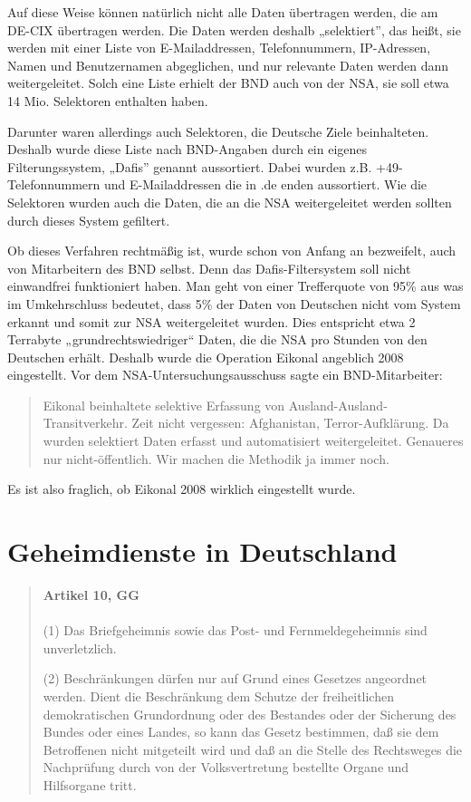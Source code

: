 \documentclass[12pt,a4paper]{scrartcl}
\begin{document}
Auf diese Weise können natürlich nicht alle Daten übertragen werden, die am DE-CIX übertragen werden. Die Daten werden deshalb „selektiert”, das heißt, sie werden mit einer Liste von E-Mailaddressen, Telefonnummern, IP-Adressen, Namen und Benutzernamen abgeglichen, und nur relevante Daten werden dann weitergeleitet. Solch eine Liste erhielt der BND auch von der NSA, sie soll etwa 14 Mio. Selektoren enthalten haben.\cite{ard_selektoren}

Darunter waren allerdings auch Selektoren, die Deutsche Ziele beinhalteten. Deshalb wurde diese Liste nach BND-Angaben durch ein eigenes Filterungssystem, „Dafis” genannt aussortiert. Dabei wurden z.B. +49-Telefonnummern und E-Mailaddressen die in .de enden aussortiert. Wie die Selektoren wurden auch die Daten, die an die NSA weitergeleitet werden sollten durch dieses System gefiltert.\cite{bundestag_selektoren}

Ob dieses Verfahren rechtmäßig ist, wurde schon von Anfang an bezweifelt, auch von Mitarbeitern des BND selbst. Denn das Dafis-Filtersystem soll nicht einwandfrei funktioniert haben. Man geht von einer Trefferquote von 95\% aus was im Umkehrschluss bedeutet, dass 5\% der Daten von Deutschen nicht vom System erkannt und somit zur NSA weitergeleitet wurden. Dies entspricht etwa 2 Terrabyte „grundrechtswiedriger“ Daten, die die NSA pro Stunden von den Deutschen erhält.\cite{wiki_eikonal} Deshalb wurde die Operation Eikonal angeblich 2008 eingestellt. Vor dem NSA-Untersuchungsausschuss sagte ein BND-Mitarbeiter:

\begin{quote}
Eikonal beinhaltete selektive Erfassung von Ausland-Ausland-Transitverkehr. Zeit nicht vergessen: Afghanistan, Terror-Aufklärung. Da wurden selektiert Daten erfasst und automatisiert weitergeleitet. Genaueres nur nicht-öffentlich. Wir machen die Methodik ja immer noch.\cite{wiki_eikonal}
\end{quote}

Es ist also fraglich, ob Eikonal 2008 wirklich eingestellt wurde.

\section{Geheimdienste in Deutschland}
\begin{quote}
\textbf{Artikel 10, GG} \\ \\
(1) Das Briefgeheimnis sowie das Post- und Fernmeldegeheimnis sind unverletzlich.

(2) Beschränkungen dürfen nur auf Grund eines Gesetzes angeordnet werden. Dient die Beschränkung dem Schutze der freiheitlichen demokratischen Grundordnung oder des Bestandes oder der Sicherung des Bundes oder eines Landes, so kann das Gesetz bestimmen, daß sie dem Betroffenen nicht mitgeteilt wird und daß an die Stelle des Rechtsweges die Nachprüfung durch von der Volksvertretung bestellte Organe und Hilfsorgane tritt.
\end{quote}
\end{document}
